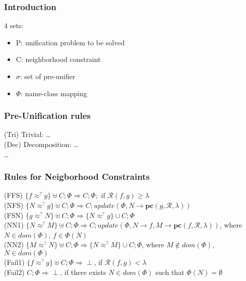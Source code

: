 

	\begin{frame}[fragile=singleslide]
	\frametitle{Introduction}
		4 sets:
		\begin{itemize}
			\item P: unification problem to be solved
			\item C: neighborhood constraint
			\item $\sigma$: set of pre-unifier
			\item $\Phi$: name-class mapping
		\end{itemize}
  \end{frame}	
		
		
	\begin{frame}[fragile=singleslide]
	\frametitle{Pre-Unification rules}
		(Tri) Trivial: \ldots \\
		(Dec) Decomposition: \ldots \\
		\ldots
	
  \end{frame}	
		
		
		\begin{frame}[fragile=singleslide]
	\frametitle{Rules for Neigborhood Constraints}
		\textcolor[rgb]{0.55,0,0}{(FFS)} $\{f \approx^? g\} \uplus C; \Phi \Rightarrow  C; \Phi; \text{ if } \mathcal{R}(f,g)\geq \lambda$ \\
		\vspace{0.3cm}
		\textcolor[rgb]{0.55,0,0}{(NFS)} $\{N \approx^? g\} \uplus C; \Phi \Rightarrow  C; update(\Phi,N\rightarrow \textbf{pc}(g,\mathcal{R},\lambda))$  \\
		\vspace{0.3cm}
		\textcolor[rgb]{0.55,0,0}{(FSN)} $\{g \approx^? N\} \uplus C; \Phi \Rightarrow  \{N \approx^? g\} \cup C;\Phi$  \\
		\vspace{0.3cm}
		\textcolor[rgb]{0.55,0,0}{(NN1)} $\{N \approx^? M\} \uplus C; \Phi \Rightarrow  C; update(\Phi,N\rightarrow {f}, M\rightarrow \textbf{pc}(f,\mathcal{R},\lambda))$, where $N \in dom(\Phi )$, $f\in \Phi(N)$ \\
		\vspace{0.3cm}
		\textcolor[rgb]{0.55,0,0}{(NN2)} $\{M \approx^? N\} \uplus C; \Phi \Rightarrow  \{N \approx^? M\} \cup C;\Phi$, where $M \notin dom(\Phi )$, $N\in dom(\Phi)$ \\
		\vspace{0.3cm}
		\textcolor[rgb]{0.55,0,0}{(Fail1)} $\{f \approx^? g\} \uplus C; \Phi \Rightarrow  \perp$, if $\mathcal{R}(f,g) < \lambda$ \\
		\vspace{0.3cm}
		\textcolor[rgb]{0.55,0,0}{(Fail2)} $C; \Phi \Rightarrow  \perp$, if there exists $N \in dom(\Phi )$ such that $\Phi (N)=\emptyset$ \\
		\vspace{0.3cm}
	
  \end{frame}	
	
